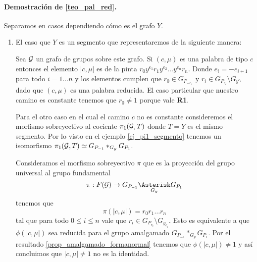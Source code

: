 \documentclass[tesis.tex]{subfiles}
\begin{document}
\paragraph{Demostración de \ref{teo_pal_red}.}
Separamos en casos dependiendo cómo es el grafo $Y$.
	\begin{enumerate}
		\item El caso que $Y$ es un segmento que representaremos de la siguiente manera:
		
		\begin{center}
		\end{center}
		Sea ${\cal G}$ un grafo de grupos sobre este grafo.		
		Si $(c, \mu)$ es una palabra de tipo $c$ entonces el elemento $|c, \mu|$ es de la pinta $r_0y^{e_1}r_1y^{e_2}\dots y^{e_n}r_n$.
		Donde $e_{i} = -e_{i+1}$ para todo $i=1 \dots n$ y los elementos cumplen que $r_0 \in G_{P_{-e_1}}$ y $r_i \in G_{P_{e_i}} \setminus G_{y^{e_i}}$ dado que $(c, \mu)$ es una palabra reducida.
		El caso particular que nuestro camino es constante tenemos que $r_0 \neq 1$ porque vale \textbf{R1}.
		
		Para el otro caso en el cual  el camino $c$ no es constante consideremos el morfismo sobreyectivo al cociente $\pi_1({\cal G},T)$ donde $T=Y$ es el mismo segmento.
		Por lo visto en el ejemplo \ref{ej_pi1_segmento} tenemos un isomorfismo $\pi_1({\cal G}, T) \simeq G_{P_{-1}} \ast_{G_y} G_{P_1}$. 
		
		Consideramos el morfismo sobreyectivo $\pi$ que es la proyección del grupo universal al grupo fundamental
		\[
		\pi: F(\cG) \to G_{P_{-1}} \underset{G_y}{\Asterisk} G_{P_1}
		\]
		tenemos que
		\[
			\pi(|c, \mu|) = r_0r_1 \dots r_n
		\]
		tal que para todo $0 \le i \le n$ vale que 
		$r_i \in G_{P_{e_i}} \setminus G_{y_{e_i}}$.
		Esto es equivalente a que $\phi(|c, \mu|)$ sea reducida para el grupo amalgamado $G_{P_{-1}} \ast_{G_y} G_{P_1}$. 
		Por el resultado \ref{prop_amalgamado_formanormal} tenemos que $\phi(|c,\mu|) \neq 1$ y así concluimos que $|c, \mu| \neq 1$ no es la identidad.
		

\end{enumerate}
\end{document}
